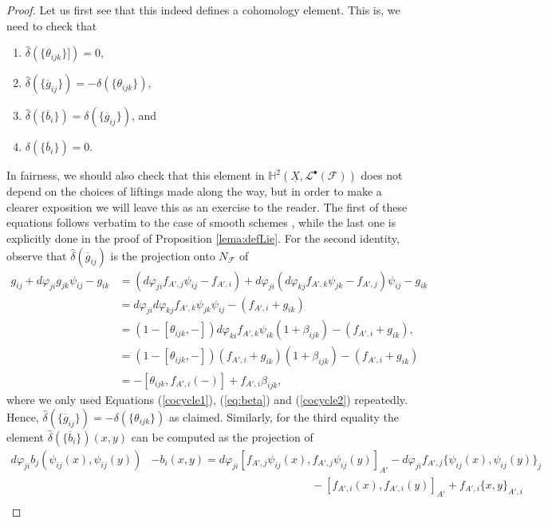 \documentclass[reqno]{amsart}
\renewcommand\H{\mathbb{H}}
\newcommand{\F}{\mathscr{F}}
\renewcommand{\H}{\mathbb{H}}
\theoremstyle{definition}
\theoremstyle{named}
\begin{document}
\begin{proof}
Let us first see that this indeed defines a cohomology element. This is, we need to check that
\begin{enumerate}
    \item $\hat{\delta}(\{\theta_{ijk}\}])=0$, 
    \item $\hat{\delta}(\{\overline{g}_{ij}\})= -\delta(\{\theta_{ijk}\})$,
    \item $\hat{\delta}(\{\overline{b}_i\})=\delta(\{\overline{g}_{ij}\})$, and
    \item $\delta(\{\overline{b}_i\})=0$.
\end{enumerate}
In fairness, we should also check that this element in $\H^2(\underline{X},\mathcal{L}^\bullet(\F))$ does not depend on the choices of liftings made along the way, but in order to make a clearer exposition we will leave this as an exercise to the reader.
The first of these equations follows verbatim to the case of smooth schemes \cite{sernesi2007deformations}, while the last one is explicitly done in the proof of Proposition \ref{lema:defLie}. For the second identity, observe that $\hat{\delta}(\overline{g}_{ij})$ is the projection onto $N_\F$ of 
\begin{align*}
g_{ij}+d\varphi_{ji}g_{jk}\psi_{ij}-g_{ik} & = (d\varphi_{ji}f_{A',j}\psi_{ij}-f_{A',i})+d\varphi_{ji}(d\varphi_{kj}f_{A',k}\psi_{jk}-f_{A',j})\psi_{ij}-g_{ik}\\
& = d\varphi_{ji}d\varphi_{kj}f_{A',k}\psi_{jk}\psi_{ij}-(f_{A',i}+g_{ik})\\
&= (1-[\theta_{ijk},-])d\varphi_{ki}f_{A',k}\psi_{ik}(1+\beta_{ijk})-(f_{A',i}+g_{ik}),\\
 & =(1-[\theta_{ijk},-])(f_{A',i}+g_{ik})(1+\beta_{ijk})-(f_{A',i}+g_{ik})\\
& = -[\theta_{ijk},f_{A',i}(-)]+f_{A',i}\beta_{ijk},
\end{align*}
where we only used Equations (\ref{cocycle1}), (\ref{eq:beta}) and (\ref{cocycle2}) repeatedly. Hence, $\hat{\delta}(\{\overline{g}_{ij}\})=-\delta(\{\theta_{ijk}\})$ as claimed.
 Similarly, for the third equality the element $\hat{\delta}(\{\overline{b}_i\})(x,y)$ can be computed as the projection of 
{\small
\begin{align*}
d\varphi_{ji}b_j(\psi_{ij}(x),\psi_{ij}(y))&- b_i(x,y)=d\varphi_{ji}[f_{A',j}\psi_{ij}(x),f_{A',j}\psi_{ij}(y)]_{A'}- d\varphi_{ji}f_{A',j}\{\psi_{ij}(x),\psi_{ij}(y)\}_j\\
&\qquad\qquad\qquad\qquad\qquad\qquad\qquad\,\,- [f_{A',i}(x),f_{A',i}(y)]_{A'}+f_{A',i}\{x,y\}_{A',i}\\

\end{align*}}
\end{proof}
\end{document}
